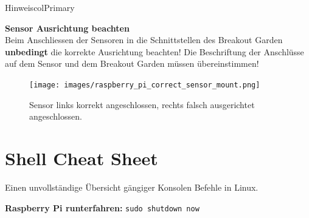 \documentclass[
  11pt,
  a4paper,
  oneside, openany  ,captions=tableheading
]{scrbook}
\theoremstyle{remark}
\begin{document}
\begin{boxtitle}{Hinweis}{colPrimary}

\textbf{Sensor Ausrichtung beachten}\\
Beim Anschliessen der Sensoren in die Schnittstellen des Breakout Garden
\textbf{unbedingt} die korrekte Ausrichtung beachten! Die Beschriftung
der Anschlüsse auf dem Sensor und dem Breakout Garden müssen
übereinstimmen!

\begin{figure}[H]

{\centering \texttt{[image: images/raspberry\_pi\_correct\_sensor\_mount.png]}

}

\caption{Sensor links korrekt angeschlossen, rechts falsch ausgerichtet
angeschlossen.}

\end{figure}%

\end{boxtitle}

\chapter{Shell Cheat Sheet}\label{shell-cheat-sheet}

Einen unvollständige Übersicht gängiger Konsolen Befehle in Linux.

\textbf{Raspberry Pi runterfahren:} \texttt{sudo\ shutdown\ now}
\end{document}
